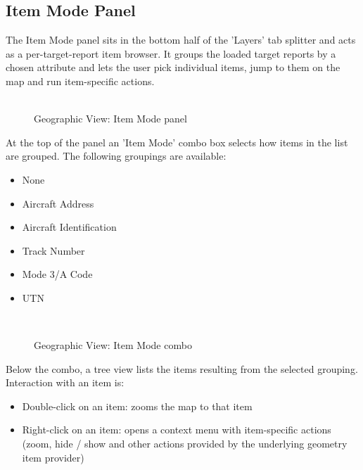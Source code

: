 \subsection{Item Mode Panel}
\label{sec:geo_item_mode}

The Item Mode panel sits in the bottom half of the 'Layers' tab splitter and acts as a per-target-report item browser. It groups the loaded target reports by a chosen attribute and lets the user pick individual items, jump to them on the map and run item-specific actions. \\\\

\begin{figure}[H]
  \centering
  \caption{Geographic View: Item Mode panel}
\end{figure}

At the top of the panel an 'Item Mode' combo box selects how items in the list are grouped. The following groupings are available:

\begin{itemize}
\item None
\item Aircraft Address
\item Aircraft Identification
\item Track Number
\item Mode 3/A Code
\item UTN
\end{itemize}
\ \\

\begin{figure}[H]
  \centering
  \caption{Geographic View: Item Mode combo}
\end{figure}

Below the combo, a tree view lists the items resulting from the selected grouping. Interaction with an item is:

\begin{itemize}
\item Double-click on an item: zooms the map to that item
\item Right-click on an item: opens a context menu with item-specific actions (zoom, hide / show and other actions provided by the underlying geometry item provider)
\end{itemize}
\ \\

